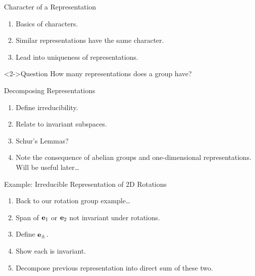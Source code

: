 \documentclass[compress,aspectratio=169,10pt,usenames,dvipsnames]{beamer}
\begin{document}

\begin{frame}{Character of a Representation}

\begin{enumerate}
  \item Basics of characters.
  \item Similar representations have the same character.
  \item Lead into uniqueness of representations.
\end{enumerate}

\vfill

\begin{block}<2->{Question}
  How many representations does a group have?
\end{block}

\vfill

\end{frame}


\begin{frame}{Decomposing Representations}

\begin{enumerate}
  \item Define irreducibility.
  \item Relate to invariant subspaces.
  \item Schur's Lemmas?
  \item Note the consequence of abelian groups and one-dimensional representations. Will be useful later\dots
\end{enumerate}

\vfill

\end{frame}


\begin{frame}{Example: Irreducible Representation of 2D Rotations}

\begin{enumerate}
  \item Back to our rotation group example\dots
  \item Span of $\mathbf{e}_1$ or $\mathbf{e}_2$ not invariant under rotations.
  \item Define $\mathbf{e}_{\pm}$.
  \item Show each is invariant.
  \item Decompose previous representation into direct sum of these two.
\end{enumerate}

\end{frame}
\end{document}
